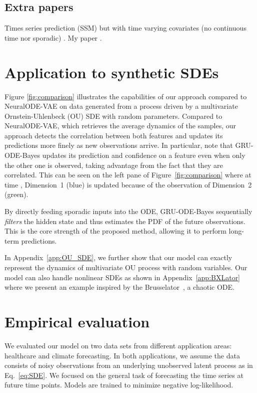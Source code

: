 \documentclass{article}
\newcommand{\method}{GRU-ODE-Bayes}
\begin{document}
\subsection{Extra papers}
Times series prediction (SSM) but with time varying covariates (no continuous time nor sporadic) \citep{rangapuram2018deep}. My paper \citep{edward}.

\fi




\section{Application to synthetic SDEs}
\label{sec:SyntheticSDEs}
Figure \ref{fig:comparison} illustrates the capabilities of our approach compared to NeuralODE-VAE on data generated from a process driven by a multivariate Ornstein-Uhlenbeck (OU) SDE with random parameters. Compared to NeuralODE-VAE, which retrieves the average dynamics of the samples, our approach detects the correlation between both features and updates its predictions more finely as new observations arrive. In particular, note that \method{} updates its prediction and confidence on a feature even when only the other one is observed, taking advantage from the fact that they are correlated. This can be seen on the left pane of Figure~\ref{fig:comparison} where at time , Dimension~1 (blue) is updated because of the observation of Dimension~2 (green). 

By directly feeding sporadic inputs into the ODE, \method{} sequentially \emph{filters} the hidden state and thus estimates the PDF of the future observations. This is the core strength of the proposed method, allowing it to perform long-term predictions.

In Appendix~\ref{app:OU_SDE}, we further show that our model can exactly represent the dynamics of multivariate OU process with random variables. Our model can also handle nonlinear SDEs as shown in Appendix~\ref{app:BXLator} where we present an example inspired by the Brusselator~\citep{prigogine1982being}, a chaotic ODE.







\section{Empirical evaluation}
\label{sec:real_world}

We evaluated our model on two data sets from different application areas: healthcare and climate forecasting. In both applications, we assume the data consists of noisy observations from an underlying unobserved latent process as in Eq.~\ref{eq:SDE}. We focused on the general task of forecasting the time series at future time points. Models are trained to minimize negative log-likelihood.
\end{document}

